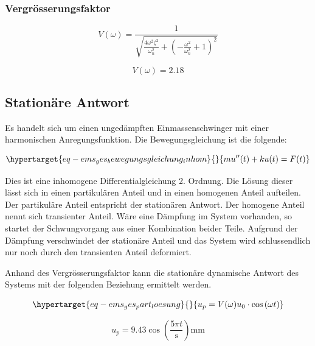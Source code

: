 \documentclass[
  letterpaper,
  DIV=11]{scrreprt}
\begin{document}
\hypertarget{vergruxf6sserungsfaktor-1}{%
\subsubsection{Vergrösserungsfaktor}\label{vergruxf6sserungsfaktor-1}}

\begin{equation}V{\left(\omega \right)} = \frac{1}{\sqrt{\frac{4 \omega^{2} \zeta_{}^{2}}{\omega_{n}^{2}} + \left(- \frac{\omega^{2}}{\omega_{n}^{2}} + 1\right)^{2}}}\end{equation}

\begin{equation}V{\left(\omega \right)} = 2.18\end{equation}

\hypertarget{stationuxe4re-antwort}{%
\subsection{Stationäre Antwort}\label{stationuxe4re-antwort}}

Es handelt sich um einen ungedämpften Einmassenschwinger mit einer
harmonischen Anregungsfunktion. Die Bewegungsgleichung ist die folgende:

\begin{equation}\protect\hypertarget{eq-ems_ges_bewegungsgleichung_inhom}{}{
mu''(t)+ ku(t) = F(t)
}\label{eq-ems_ges_bewegungsgleichung_inhom}\end{equation}

Dies ist eine inhomogene Differentialgleichung 2. Ordnung. Die Lösung
dieser lässt sich in einen partikulären Anteil und in einen homogenen
Anteil aufteilen. Der partikuläre Anteil entspricht der stationären
Antwort. Der homogene Anteil nennt sich transienter Anteil. Wäre eine
Dämpfung im System vorhanden, so startet der Schwungvorgang aus einer
Kombination beider Teile. Aufgrund der Dämpfung verschwindet der
stationäre Anteil und das System wird schlussendlich nur noch durch den
transienten Anteil deformiert.

Anhand des Vergrösserungsfaktor kann die stationäre dynamische Antwort
des Systems mit der folgenden Beziehung ermittelt werden.

\begin{equation}\protect\hypertarget{eq-ems_ges_part_loesung}{}{
u_p = V(\omega)u_0 \cdot \cos{(\omega t)}
}\label{eq-ems_ges_part_loesung}\end{equation}

\begin{equation}u_{p} = 9.43 \cos{\left(\frac{5 \pi t}{\text{s}} \right)} \text{mm}\end{equation}
\end{document}

